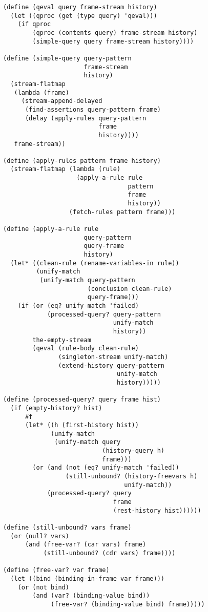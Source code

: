 \documentclass[a4paper,12pt]{article}
\begin{document}
\begin{lstlisting}
(define (qeval query frame-stream history)
  (let ((qproc (get (type query) 'qeval)))
    (if qproc
        (qproc (contents query) frame-stream history)
        (simple-query query frame-stream history))))

(define (simple-query query-pattern
                      frame-stream
                      history)
  (stream-flatmap
   (lambda (frame)
     (stream-append-delayed
      (find-assertions query-pattern frame)
      (delay (apply-rules query-pattern
                          frame
                          history))))
   frame-stream))

(define (apply-rules pattern frame history)
  (stream-flatmap (lambda (rule)
                    (apply-a-rule rule
                                  pattern
                                  frame
                                  history))
                  (fetch-rules pattern frame)))

(define (apply-a-rule rule
                      query-pattern
                      query-frame
                      history)
  (let* ((clean-rule (rename-variables-in rule))
         (unify-match
          (unify-match query-pattern
                       (conclusion clean-rule)
                       query-frame)))
    (if (or (eq? unify-match 'failed)
            (processed-query? query-pattern
                              unify-match
                              history))
        the-empty-stream
        (qeval (rule-body clean-rule)
               (singleton-stream unify-match)
               (extend-history query-pattern
                               unify-match
                               history)))))

(define (processed-query? query frame hist)
  (if (empty-history? hist)
      #f
      (let* ((h (first-history hist))
             (unify-match
              (unify-match query
                           (history-query h)
                           frame)))
        (or (and (not (eq? unify-match 'failed))
                 (still-unbound? (history-freevars h)
                                 unify-match))
            (processed-query? query
                              frame
                              (rest-history hist))))))

(define (still-unbound? vars frame)
  (or (null? vars)
      (and (free-var? (car vars) frame)
           (still-unbound? (cdr vars) frame))))

(define (free-var? var frame)
  (let ((bind (binding-in-frame var frame)))
    (or (not bind)
        (and (var? (binding-value bind))
             (free-var? (binding-value bind) frame)))))


\end{lstlisting}
\end{document}
